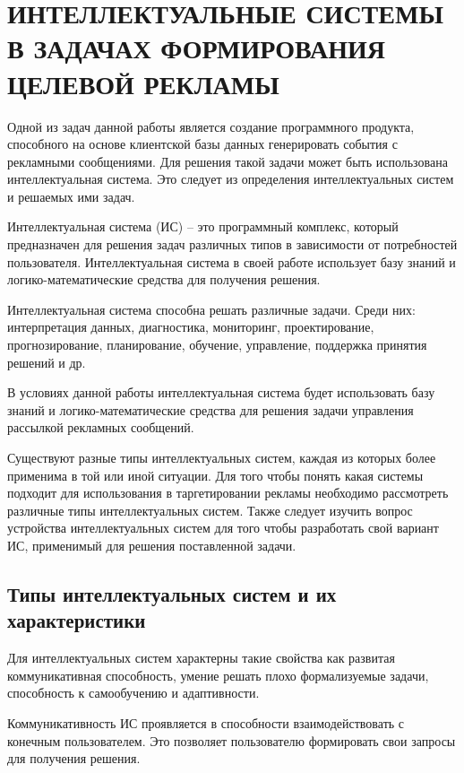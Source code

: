 \chapter{ИНТЕЛЛЕКТУАЛЬНЫЕ СИСТЕМЫ В ЗАДАЧАХ ФОРМИРОВАНИЯ ЦЕЛЕВОЙ РЕКЛАМЫ}

Одной из задач данной работы является создание программного продукта, способного на основе клиентской базы данных генерировать события с рекламными сообщениями. Для решения такой задачи может быть использована  интеллектуальная система. Это следует из определения интеллектуальных систем и решаемых ими задач.

Интеллектуальная система (ИС) – это программный комплекс, который предназначен для решения задач различных типов в зависимости от потребностей пользователя. Интеллектуальная система в своей работе использует базу знаний и логико-математические средства для получения решения.

Интеллектуальная система способна решать различные задачи. Среди них: интерпретация данных, диагностика, мониторинг, проектирование, прогнозирование, планирование, обучение, управление, поддержка принятия решений и др.\cite{is1}

В условиях данной работы интеллектуальная система будет использовать базу знаний и логико-математические средства для решения задачи управления рассылкой рекламных сообщений.

Существуют разные типы интеллектуальных систем, каждая из которых более применима в той или иной ситуации. Для того чтобы понять какая системы подходит для использования в таргетировании рекламы необходимо рассмотреть различные типы интеллектуальных систем. Также следует изучить вопрос устройства интеллектуальных систем для того чтобы разработать свой вариант ИС, применимый для решения поставленной задачи.

\section{Типы интеллектуальных систем и их характеристики}

Для интеллектуальных систем характерны такие свойства как развитая коммуникативная способность, умение решать плохо формализуемые задачи, способность к самообучению и адаптивности.

Коммуникативность ИС проявляется в способности взаимодействовать с конечным пользователем. Это позволяет пользователю формировать свои запросы для получения решения.


